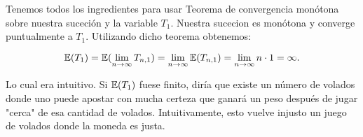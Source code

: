 	Tenemos todos los ingredientes para usar Teorema de convergencia monótona sobre nuestra suceción
	y la variable $T_1$. Nuestra sucecion es monótona y converge puntualmente a $T_1$. Utilizando
	dicho teorema obtenemos:
	
	$$
	\mathbb{E}(T_1) = 
	\mathbb{E}(\lim_{n\rightarrow\infty} T_{n,1}) = 
	\lim_{n\rightarrow\infty} \mathbb{E}(T_{n,1}) = 
	\lim_{n\rightarrow\infty} n\cdot 1 =
	\infty.
	$$
	
	Lo cual era intuitivo. Si $\mathbb{E}(T_1)$ fuese finito, diría que existe un número de volados donde
	uno puede apostar con mucha certeza que ganará un peso después de jugar "cerca" de esa cantidad
	de volados. Intuitivamente, esto vuelve injusto un juego de volados donde la moneda es
	justa.\\
	